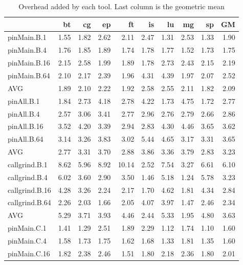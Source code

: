 \iffalse
\begin{table*}[]
\caption{Overhead added by each tool. Last column is the geometric mean}
\label{comet_sd_pMpAcg_BC_itn_p3.5}\begin{center}
\begin{tabular}{lrrrrrrrrr}
\hline
                &   bt &   cg &    ep &    ft &   is &   lu &   mg &   sp &   GM \\
\hline
 pinMain.B.1    & 1.55 & 1.82 &  2.62 &  2.11 & 2.47 & 1.31 & 2.53 & 1.33 & 1.90 \\
 pinMain.B.4    & 1.76 & 1.85 &  1.89 &  1.74 & 1.78 & 1.77 & 1.52 & 1.73 & 1.75 \\
 pinMain.B.16   & 2.15 & 2.58 &  1.99 &  1.89 & 1.78 & 2.73 & 2.43 & 2.15 & 2.19 \\
 pinMain.B.64   & 2.10 & 2.17 &  2.39 &  1.96 & 4.31 & 4.39 & 1.97 & 2.07 & 2.52 \\
 AVG            & 1.89 & 2.10 &  2.22 &  1.92 & 2.58 & 2.55 & 2.11 & 1.82 & 2.09 \\
 pinAll.B.1     & 1.84 & 2.73 &  4.18 &  2.78 & 4.22 & 1.73 & 4.75 & 1.72 & 2.77 \\
 pinAll.B.4     & 2.57 & 3.06 &  3.41 &  2.77 & 2.96 & 2.76 & 2.79 & 2.66 & 2.86 \\
 pinAll.B.16    & 3.52 & 4.20 &  3.39 &  2.94 & 2.83 & 4.30 & 4.46 & 3.65 & 3.62 \\
 pinAll.B.64    & 3.14 & 3.26 &  3.83 &  3.02 & 5.44 & 4.65 & 3.17 & 3.31 & 3.65 \\
 AVG            & 2.77 & 3.31 &  3.70 &  2.88 & 3.86 & 3.36 & 3.79 & 2.83 & 3.23 \\
 callgrind.B.1  & 8.62 & 5.96 &  8.92 & 10.14 & 2.52 & 7.54 & 3.27 & 6.61 & 6.10 \\
 callgrind.B.4  & 6.02 & 3.60 &  2.90 &  3.50 & 1.46 & 5.18 & 1.24 & 5.78 & 3.23 \\
 callgrind.B.16 & 4.28 & 3.26 &  2.24 &  2.17 & 1.70 & 4.62 & 1.81 & 4.34 & 2.84 \\
 callgrind.B.64 & 2.26 & 2.03 &  1.66 &  2.05 & 4.07 & 3.97 & 1.47 & 2.46 & 2.34 \\
 AVG            & 5.29 & 3.71 &  3.93 &  4.46 & 2.44 & 5.33 & 1.95 & 4.80 & 3.63 \\
 pinMain.C.1    & 1.41 & 1.29 &  2.51 &  1.89 & 2.29 & 1.12 & 1.74 & 1.10 & 1.60 \\
 pinMain.C.4    & 1.58 & 1.73 &  1.75 &  1.62 & 1.68 & 1.33 & 1.81 & 1.35 & 1.60 \\
 pinMain.C.16   & 1.82 & 2.38 &  2.46 &  1.51 & 1.80 & 2.18 & 2.36 & 1.80 & 2.01 \\

\end{tabular}
\end{center}
\end{table*}
